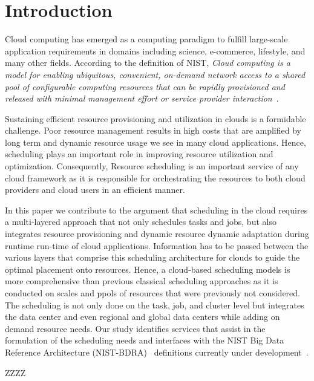 \documentclass[final,5p,times,twocolumn]{elsarticle}
\begin{document}
\section{Introduction}


Cloud computing has emerged as a computing paradigm to fulfill large-scale
application requirements in domains including science, e-commerce, lifestyle,
and many other fields. According to the definition of NIST, {\em Cloud computing
is a model for enabling ubiquitous, convenient, on-demand network access to a
shared pool of configurable computing resources that can be rapidly provisioned
and released with minimal management effort or service provider
interaction}~\cite{mell2011nist}.

Sustaining efficient resource provisioning and utilization in clouds is a
formidable challenge. Poor resource management results in high costs that are
amplified by long term and dynamic resource usage we see in many cloud
applications. Hence, scheduling plays an important role in improving resource
utilization and optimization. Consequently, Resource scheduling is an important
service of any cloud framework as it is responsible for orchestrating the
resources to both cloud providers and cloud users in an efficient manner.

In this paper we contribute to the argument that scheduling in the cloud
requires a multi-layered approach that not only schedules tasks and jobs, but
also integrates resource provisioning and dynamic resource dynamic adaptation
during runtime run-time of cloud applications. Information has to be passed
between the various layers that comprise this scheduling architecture for clouds
to guide the optimal placement onto resources. Hence, a cloud-based scheduling
models is more comprehensive than previous classical scheduling approaches as it
is conducted on scales and ppols of resources that were previously not
considered. The scheduling is not only done on the task, job, and cluster level
but integrates the data center and even regional and global data centers while
adding on demand resource needs. Our study identifies services that assist in
the formulation of the scheduling needs and interfaces with the NIST Big Data
Reference Architecture (NIST-BDRA)~\cite{nist-bdra-vol6}
definitions currently under development~\cite{nist-bdra-vol8}.

ZZZZ
\end{document}
